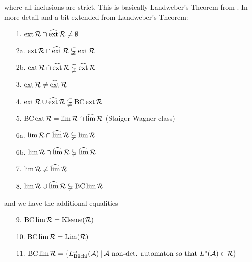where all inclusions are strict. This is basically Landweber's Theorem from \cite{Landweber69}. In more detail and a bit extended from Landweber's Theorem:

\begin{theorem}[Landweber]
\label{P:reg-star}

\begin{enumerate}
\item[1.] $\operatorname{ext} \mathcal{R} \cap \operatorname{\widehat{ext}} \mathcal{R} \neq \emptyset$
\item[2a.] $\operatorname{ext} \mathcal{R} \cap \operatorname{\widehat{ext}} \mathcal{R} \subsetneqq \operatorname{ext} \mathcal{R}$
\item[2b.] $\operatorname{ext} \mathcal{R} \cap \operatorname{\widehat{ext}} \mathcal{R} \subsetneqq \operatorname{\widehat{ext}} \mathcal{R}$
\item[3.] $\operatorname{ext} \mathcal{R} \neq \operatorname{\widehat{ext}} \mathcal{R}$
\item[4.] $\operatorname{ext} \mathcal{R} \cup \operatorname{\widehat{ext}} \mathcal{R} \subsetneqq \operatorname{BC} \operatorname{ext} \mathcal{R}$
\item[5.] $\operatorname{BC} \operatorname{ext} \mathcal{R} = \lim \mathcal{R} \cap \operatorname{\widehat{lim}} \mathcal{R}$ (Staiger-Wagner class)
\item[6a.] $\lim \mathcal{R} \cap \operatorname{\widehat{lim}} \mathcal{R} \subsetneqq \lim \mathcal{R}$
\item[6b.] $\lim \mathcal{R} \cap \operatorname{\widehat{lim}} \mathcal{R} \subsetneqq \operatorname{\widehat{lim}} \mathcal{R}$
\item[7.] $\lim \mathcal{R} \neq \operatorname{\widehat{lim}} \mathcal{R}$
\item[8.] $\lim \mathcal{R} \cup \operatorname{\widehat{lim}} \mathcal{R} \subsetneqq \operatorname{BC} \lim \mathcal{R}$
\end{enumerate}
and we have the additional equalities
\begin{enumerate}
\item[9.] $\operatorname{BC} \lim \mathcal{R} = \operatorname{Kleene}(\mathcal{R})$
\item[10.] $\operatorname{BC} \lim \mathcal{R} = \operatorname{Lim}(\mathcal{R})$
\item[11.] $\BC \lim \mathcal{R} = \Set{L_{\text{Büchi}}^\omega(\A)}{\A \text{ non-det. automaton so that } L^*(\A) \in \mathcal{R}}$
\end{enumerate}


\end{theorem}
